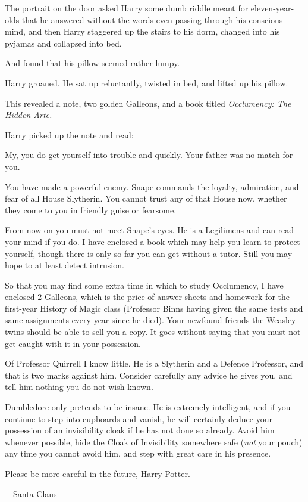 The portrait on the door asked Harry some dumb riddle meant for eleven-year-olds that he answered without the words even passing through his conscious mind, and then Harry staggered up the stairs to his dorm, changed into his pyjamas and collapsed into bed.

And found that his pillow seemed rather lumpy.

Harry groaned. He sat up reluctantly, twisted in bed, and lifted up his pillow.

This revealed a note, two golden Galleons, and a book titled \emph{Occlumency: The Hidden Arte.}

Harry picked up the note and read:

\begin{writtenNote}
My, you do get yourself into trouble and quickly. Your father was no match for you.

You have made a powerful enemy. Snape commands the loyalty, admiration, and fear of all House Slytherin. You cannot trust any of that House now, whether they come to you in friendly guise or fearsome.

From now on you must not meet Snape’s eyes. He is a Legilimens and can read your mind if you do. I have enclosed a book which may help you learn to protect yourself, though there is only so far you can get without a tutor. Still you may hope to at least detect intrusion.

So that you may find some extra time in which to study Occlumency, I have enclosed 2 Galleons, which is the price of answer sheets and homework for the first-year History of Magic class (Professor Binns having given the same tests and same assignments every year since he died). Your newfound friends the Weasley twins should be able to sell you a copy. It goes without saying that you must not get caught with it in your possession.

Of Professor Quirrell I know little. He is a Slytherin and a Defence Professor, and that is two marks against him. Consider carefully any advice he gives you, and tell him nothing you do not wish known.

Dumbledore only pretends to be insane. He is extremely intelligent, and if you continue to step into cupboards and vanish, he will certainly deduce your possession of an invisibility cloak if he has not done so already. Avoid him whenever possible, hide the Cloak of Invisibility somewhere safe (\emph{not} your pouch) any time you cannot avoid him, and step with great care in his presence.

Please be more careful in the future, Harry Potter.

—Santa Claus
\end{writtenNote}

